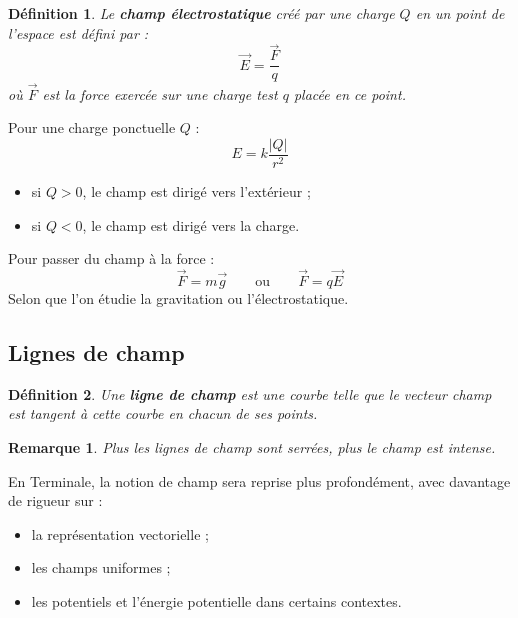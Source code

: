 \documentclass[11pt,a4paper]{article}
\newtheorem{definition}{Définition}[section]
\newtheorem{remarque}{Remarque}[section]
\begin{document}
\begin{definition}
Le \textbf{champ électrostatique} créé par une charge $Q$ en un point de l'espace est défini par :
\[
\vec{E}=\frac{\vec{F}}{q}
\]
où $\vec{F}$ est la force exercée sur une charge test $q$ placée en ce point.
\end{definition}

Pour une charge ponctuelle $Q$ :
\[
E = k\frac{|Q|}{r^2}
\]

\begin{itemize}
    \item si $Q>0$, le champ est dirigé vers l'extérieur ;
    \item si $Q<0$, le champ est dirigé vers la charge.
\end{itemize}

\begin{methodebox}
Pour passer du champ à la force :
\[
\vec{F}=m\vec{g}
\qquad \text{ou} \qquad
\vec{F}=q\vec{E}
\]
Selon que l'on étudie la gravitation ou l'électrostatique.
\end{methodebox}

\subsection{Lignes de champ}

\begin{definition}
Une \textbf{ligne de champ} est une courbe telle que le vecteur champ est tangent à cette courbe en chacun de ses points.
\end{definition}

\begin{center}
\end{center}

\begin{remarque}
Plus les lignes de champ sont serrées, plus le champ est intense.
\end{remarque}

\begin{terminalebox}
En Terminale, la notion de champ sera reprise plus profondément, avec davantage de rigueur sur :
\begin{itemize}
    \item la représentation vectorielle ;
    \item les champs uniformes ;
    \item les potentiels et l'énergie potentielle dans certains contextes.
\end{itemize}
\end{terminalebox}
\end{document}
